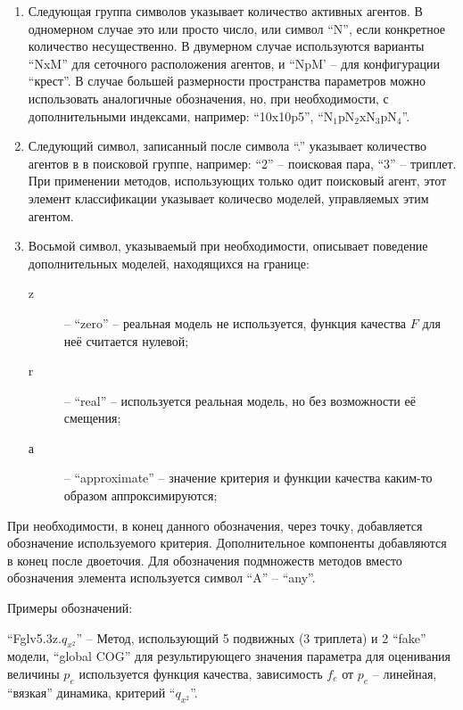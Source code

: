 \begin{enumerate}
\begin{description}
    \end{description}

  \item
    Следующая группа символов указывает количество активных агентов.
    В одномерном случае это или просто число, или символ ``N'', если
    конкретное количество несущественно. В двумерном случае
    используются варианты ``NxM'' для сеточного расположения агентов,
    и ``NpM'  -- для конфигурации ``крест''. В случае большей размерности
    пространства параметров можно использовать аналогичные обозначения,
    но, при необходимости, с дополнительными индексами, например:
    ``10x10p5'', ``$\mathrm{N_1 p N_2 x N_3 p N_4}$''.

  \item
    Следующий символ, записанный после символа ``.'' указывает количество агентов в
    в поисковой группе, например: ``2'' -- поисковая пара, ``3'' -- триплет.
    При применении методов, использующих только одит поисковый агент,
    этот элемент классификации указывает количесво моделей, управляемых этим агентом.

  \item Восьмой символ, указываемый при необходимости, описывает
    поведение дополнительных моделей, находящихся на границе:
    \begin{description}

      \item[z]  -- ``zero'' -- реальная модель не используется, функция качества $F$ для неё считается нулевой;

      \item[r] -- ``real'' --  используется реальная модель, но без возможности её смещения;

      \item[а] -- ``approximate'' -- значение критерия и функции качества каким-то образом аппроксимируются;

    \end{description}

\end{enumerate}

При необходимости, в конец данного обозначения, через точку, добавляется обозначение используемого критерия.
Дополнительное компоненты добавляются в конец после двоеточия. Для обозначения подмножеств методов
вместо обозначения элемента используется символ ``A'' -- ``any''.


Примеры обозначений:

``Fglv5.3z.$q_{x^2}$'' -- Метод, использующий 5 подвижных (3 триплета) и 2 ``fake'' модели,
``global COG'' для результирующего значения параметра
для оценивания величины $p_e$ используется функция качества,
зависимость $f_e$ от $p_e$ -- линейная, ``вязкая'' динамика, критерий ``$q_{x^2}$''.


